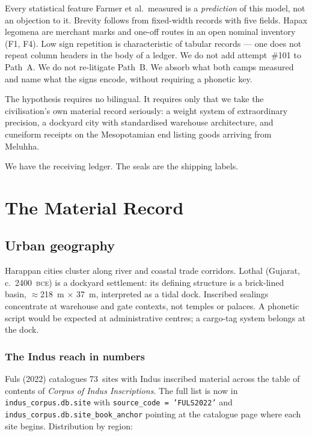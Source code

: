 Every statistical feature Farmer et al.\ measured is a
\emph{prediction} of this model, not an objection to it.
Brevity follows from fixed-width records with five fields.
Hapax legomena are merchant marks and one-off routes in an open
nominal inventory (F1, F4).
Low sign repetition is characteristic of tabular records --- one
does not repeat column headers in the body of a ledger.
We do not add attempt~\#101 to Path~A.
We do not re-litigate Path~B.
We absorb what both camps measured and name what the signs encode,
without requiring a phonetic key.

The hypothesis requires no bilingual.
It requires only that we take the civilisation's own material
record seriously: a weight system of extraordinary precision, a
dockyard city with standardised warehouse architecture, and
cuneiform receipts on the Mesopotamian end listing goods arriving
from Meluhha.\smartcite{Ratnagar2004}

We have the receiving ledger. The seals are the shipping labels.

\section{The Material Record}

\subsection{Urban geography}

Harappan cities cluster along river and coastal trade corridors.
Lothal (Gujarat, c.\ 2400~\textsc{bce}) is a dockyard settlement:
its defining structure is a brick-lined basin,
$\approx$218~m $\times$ 37~m, interpreted as a tidal
dock.\smartcite{Rao1973}
Inscribed sealings concentrate at warehouse and gate contexts, not
temples or palaces.
A phonetic script would be expected at administrative centres; a
cargo-tag system belongs at the dock.

\subsubsection*{The Indus reach in numbers}

Fuls (2022) catalogues 73~sites with Indus inscribed material across
the table of contents of \textit{Corpus of Indus
Inscriptions}.\smartcite{Fuls2022} The full list is now in
\texttt{indus\_corpus.db.site} with \texttt{source\_code = 'FULS2022'}
and \texttt{indus\_corpus.db.site\_book\_anchor} pointing at the
catalogue page where each site begins. Distribution by region:

